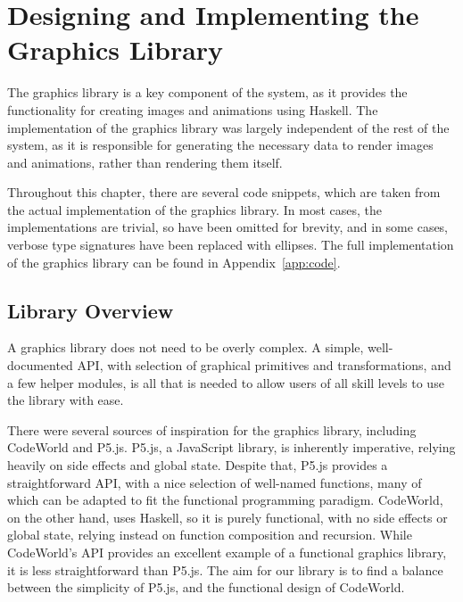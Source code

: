 \documentclass[../main.tex]{subfiles}
\begin{document}
\chapter{Designing and Implementing the Graphics Library} \label{ch:graphics}
    The graphics library is a key component of the system, as it provides the
        functionality for creating images and animations using Haskell.
    The implementation of the graphics library was largely independent of the rest
        of the system, as it is responsible for generating the necessary data to render
        images and animations, rather than rendering them itself.

    Throughout this chapter, there are several code snippets, which are taken from
        the actual implementation of the graphics library.
    In most cases, the implementations are trivial, so have been omitted for
        brevity, and in some cases, verbose type signatures have been replaced with
        ellipses.
    The full implementation of the graphics library can be found in
        Appendix~\ref{app:code}.

    \section{Library Overview}
        A graphics library does not need to be overly complex.
        A simple, well-documented API, with selection of graphical primitives and
            transformations, and a few helper modules, is all that is needed to allow users
            of all skill levels to use the library with ease.

        There were several sources of inspiration for the graphics library, including
            CodeWorld and P5.js.
        P5.js, a JavaScript library, is inherently imperative, relying heavily on side
            effects and global state.
        Despite that, P5.js provides a straightforward API, with a nice selection of
            well-named functions, many of which can be adapted to fit the functional
            programming paradigm.
        CodeWorld, on the other hand, uses Haskell, so it is purely functional, with no
            side effects or global state, relying instead on function composition and
            recursion.
        While CodeWorld's API provides an excellent example of a functional graphics
            library, it is less straightforward than P5.js.
        The aim for our library is to find a balance between the simplicity of P5.js,
            and the functional design of CodeWorld.
\end{document}
